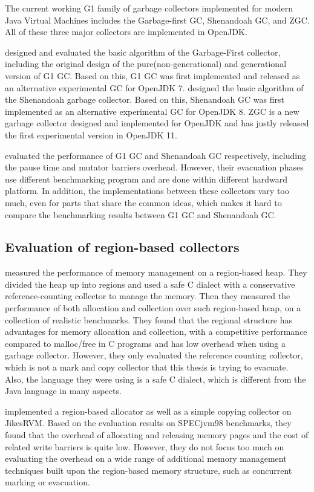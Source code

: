 The current working G1 family of garbage collectors implemented for modern Java Virtual Machines
includes the Garbage-first GC, Shenandoah GC, and ZGC.
All of these three major collectors are implemented in OpenJDK.

\cite{detlefs2004garbage} designed and evaluated the basic algorithm of the Garbage-First collector,
including the original design of the pure(non-generational) and generational version
of G1 GC. Based on this, G1 GC was first implemented and released as an alternative
experimental GC for OpenJDK 7. \cite{flood2016shenandoah} designed the basic algorithm
of the Shenandoah garbage collector.
Based on this, Shenandoah GC was first implemented as an alternative experimental GC for OpenJDK 8.
ZGC is a new garbage collector designed and implemented for OpenJDK
and has justly released the first experimental version in OpenJDK 11.

\citep{detlefs2004garbage,flood2016shenandoah} evaluated the performance of G1 GC
and Shenandoah GC respectively, including the pause time and mutator barriers overhead.
However, their evacuation phases use different benchmarking program and are done within
different hardward platform. In addition, the implementations between these collectors
vary too much, even for parts that share the common ideas, which makes it hard to
compare the benchmarking results between G1 GC and Shenandoah GC.

\subsection{Evaluation of region-based collectors}

\cite{gay1998memory} measured the performance of memory management on a region-based heap.
They divided the heap up into regions and used a safe C dialect
with a conservative reference-counting collector to manage the memory. Then they
measured the performance of both allocation and collection over such region-based heap,
on a collection of realistic benchmarks. They found that the regional structure has
advantages for memory allocation and collection, with a competitive performance
compared to malloc/free in C programs and has low overhead when using a garbage collector.
However, they only evaluated the reference counting collector, which is not a
mark and copy collector that this thesis is trying to evacuate. Also, the
language they were using is a safe C dialect, which is different from the Java language
in many aspects.

\cite{qian2002adaptive} implemented a region-based allocator as well as a simple copying
collector on JikesRVM. Based on the evaluation results on SPECjvm98 benchmarks,
they found that the overhead of allocating and releasing memory pages
and the cost of related write barriers is quite low.
However, they do not focus too much on evaluating the overhead on a wide range of
additional memory management techniques built upon the region-based memory structure,
such as concurrent marking or evacuation.

